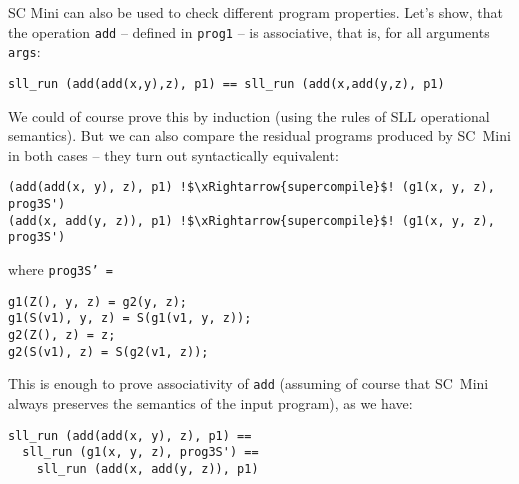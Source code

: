 % 

%

SC Mini can also be used to check different program properties.
Let's show, that the operation \texttt{add} -- defined in \texttt{prog1} --
is associative, that is, for all arguments \texttt{args}:
\begin{lstlisting}
sll_run (add(add(x,y),z), p1) == sll_run (add(x,add(y,z), p1)
\end{lstlisting}
We could of course prove this by induction (using the rules of SLL operational semantics).
But we can also compare the residual programs produced by SC~Mini in both cases --
they turn out syntactically equivalent:
\begin{lstlisting}[language=sll,escapechar=!]
(add(add(x, y), z), p1) !$\xRightarrow{supercompile}$! (g1(x, y, z), prog3S')
(add(x, add(y, z)), p1) !$\xRightarrow{supercompile}$! (g1(x, y, z), prog3S')
\end{lstlisting}
where \texttt{prog3S' =}
\begin{lstlisting}[language=sll]
g1(Z(), y, z) = g2(y, z);
g1(S(v1), y, z) = S(g1(v1, y, z));
g2(Z(), z) = z;
g2(S(v1), z) = S(g2(v1, z));
\end{lstlisting}
This is enough to prove associativity of \texttt{add} (assuming of course
that SC~Mini always preserves the semantics of the input program), as we have:
\begin{lstlisting}
sll_run (add(add(x, y), z), p1) ==
  sll_run (g1(x, y, z), prog3S') ==
    sll_run (add(x, add(y, z)), p1)
\end{lstlisting}
